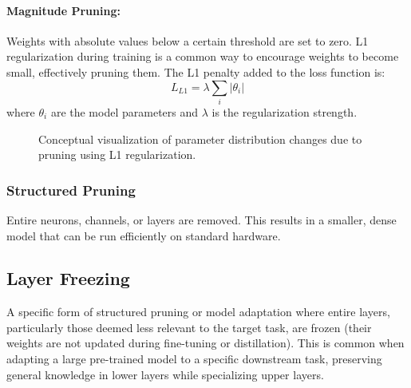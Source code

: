 \documentclass[12pt, a4paper]{report}
\begin{document}
\paragraph{Magnitude Pruning:} Weights with absolute values below a certain threshold are set to zero. L1 regularization during training is a common way to encourage weights to become small, effectively pruning them. The L1 penalty added to the loss function is:
$$ L_{L1} = \lambda \sum_i |\theta_i| $$
where $\theta_i$ are the model parameters and $\lambda$ is the regularization strength.

\begin{figure}[h!]
\centering
\caption{Conceptual visualization of parameter distribution changes due to pruning using L1 regularization.}
\label{fig:param_dist}
\end{figure}

\subsubsection{Structured Pruning}
Entire neurons, channels, or layers are removed. This results in a smaller, dense model that can be run efficiently on standard hardware.

\subsection{Layer Freezing}
A specific form of structured pruning or model adaptation where entire layers, particularly those deemed less relevant to the target task, are frozen (their weights are not updated during fine-tuning or distillation). This is common when adapting a large pre-trained model to a specific downstream task, preserving general knowledge in lower layers while specializing upper layers.
\end{document}
